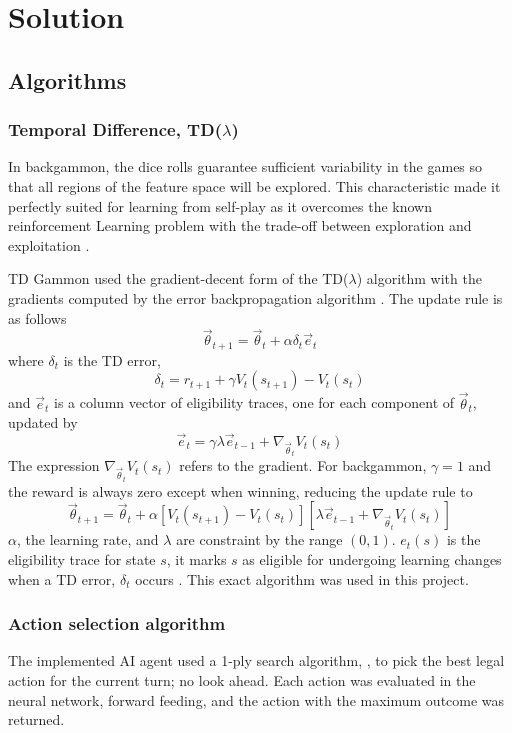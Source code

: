 \documentclass[12pt,a4paper]{article}
\begin{document}
\section{Solution}
\subsection{Algorithms}
\subsubsection{Temporal Difference, TD($\lambda$)}
In backgammon, the dice rolls guarantee sufficient variability in the games so that all regions of the feature space will be explored. This characteristic made it perfectly suited for learning from self-play as it overcomes the known reinforcement Learning problem with the trade-off between exploration and exploitation \cite{survey}. 

TD Gammon used the gradient-decent form of the TD($\lambda$) algorithm with the gradients computed by the error backpropagation algorithm \cite{rl}. The update rule is as follows
$$\vec{\theta}_{t+1} = \vec{\theta}_{t} + \alpha\delta_t\vec{e}_{t}$$ 
where $\delta_t$ is the TD error,
$$\delta_{t} = r_{t+1} + \gamma V_t(s_{t+1}) - V_t(s_t)$$ 
and $\vec{e}_t$ is a column vector of eligibility traces, one for each component of $\vec{\theta}_t$, updated by 
$$\vec{e}_{t} = \gamma\lambda\vec{e}_{t-1} + \nabla_{\vec{\theta}_{t}}V_t(s_t)$$ 
The expression $\nabla_{\vec{\theta}_{t}}V_t(s_t)$ refers to the gradient. For backgammon, $\gamma=1$ and the reward is always zero except when winning, reducing the update rule to
$$\vec{\theta}_{t+1} = \vec{\theta}_{t} + \alpha[V_t(s_{t+1}) - V_t(s_t)][\lambda\vec{e}_{t-1} + \nabla_{\vec{\theta}_{t}}V_t(s_t)]$$
$\alpha$, the learning rate, and $\lambda$ are constraint by the range $(0,1)$. $e_t(s)$ is the eligibility trace for state $s$, it marks $s$ as eligible for undergoing learning changes when a TD error, $\delta_t$ occurs \cite{rl}. This exact algorithm was used in this project.

\subsubsection{Action selection algorithm}
The implemented AI agent used a 1-ply search algorithm, \cite{DBLP:conf/icml/Tesauro92}, to pick the best legal action for the current turn; no look ahead. Each action was evaluated in the neural network, forward feeding, and the action with the maximum outcome was returned. 
\end{document}
